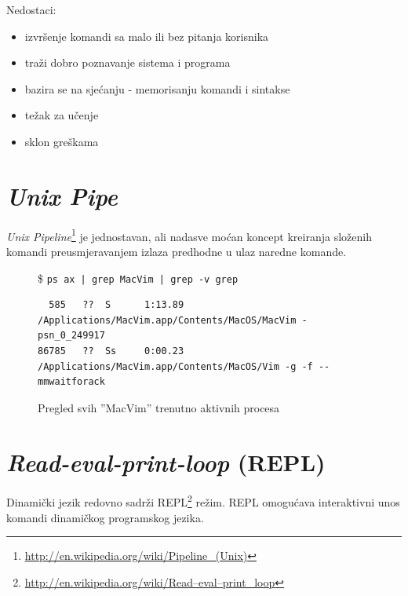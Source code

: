 \documentclass[times, utf8, seminar]{fit}
\begin{document}
Nedostaci:
\begin{itemize}
\item izvršenje komandi sa malo ili bez pitanja korisnika
\item traži dobro poznavanje sistema i programa
\item bazira se na sjećanju - memorisanju komandi i sintakse
\item težak za učenje
\item sklon greškama
\end{itemize}

%
%
%
%
%

\section{\emph{Unix Pipe}}

\emph{Unix Pipeline}\footnote{\url{http://en.wikipedia.org/wiki/Pipeline_(Unix)}} je jednostavan, ali nadasve moćan koncept kreiranja složenih komandi preusmjeravanjem izlaza predhodne u ulaz naredne komande.

\begin{figure}[H]
\$ \verb+ps ax | grep MacVim | grep -v grep+
\begin{lstlisting}
  585   ??  S      1:13.89 /Applications/MacVim.app/Contents/MacOS/MacVim -psn_0_249917
86785   ??  Ss     0:00.23 /Applications/MacVim.app/Contents/MacOS/Vim -g -f --mmwaitforack
\end{lstlisting}

\caption{Pregled svih ''MacVim'' trenutno aktivnih procesa}
\end{figure}


\section{\emph{Read-eval-print-loop} (REPL)}

Dinamički jezik redovno sadrži REPL\footnote{\url{http://en.wikipedia.org/wiki/Read–eval–print_loop}} režim.
REPL omogućava interaktivni unos komandi dinamičkog programskog jezika.
\end{document}
